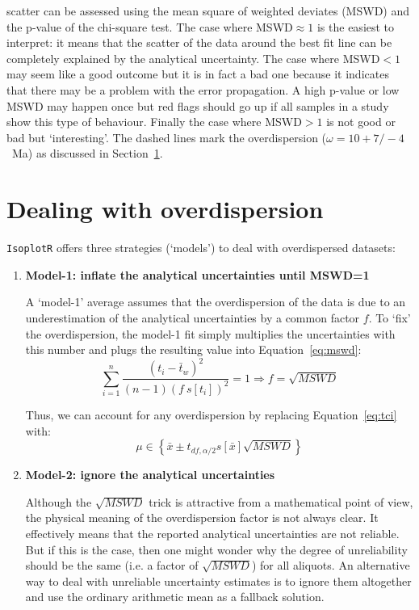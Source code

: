 \begin{refsection}
\begin{minipage}[t]{.58\textwidth}
{    scatter can be assessed using the mean square of weighted deviates
    (MSWD) and the p-value of the chi-square test. The case where
    MSWD$\approx{1}$ is the easiest to interpret: it means that the
    scatter of the data around the best fit line can be completely
    explained by the analytical uncertainty. The case where MSWD$<{1}$
    may seem like a good outcome but it is in fact a bad one because
    it indicates that there may be a problem with the error
    propagation. A high p-value or low MSWD may happen once but red
    flags should go up if all samples in a study show this type of
    behaviour. Finally the case where MSWD$>{1}$ is not good or bad
    but `interesting'. The dashed lines mark the overdispersion
    ($\omega=10 +7/-4$~Ma) as discussed in
    Section~\ref{sec:overdispersion}.}
  \label{fig:wtdmeanMSWD}
\end{minipage}

\section{Dealing with overdispersion}
\label{sec:overdispersion}

\texttt{IsoplotR} offers three strategies (`models') to deal with
overdispersed datasets:

\begin{enumerate}
\item\textbf{Model-1: inflate the analytical uncertainties until MSWD=1}

  A `model-1' average assumes that the overdispersion of the data is due
  to an underestimation of the analytical uncertainties by a common
  factor $f$. To `fix' the overdispersion, the model-1 fit simply
  multiplies the uncertainties with this number and plugs the resulting
  value into Equation~\ref{eq:mswd}:
  \[
  \sum\limits_{i=1}^{n}\frac{(t_i-\bar{t}_w)^2}{(n-1) (f~s[t_i])^2} = 1
  \Rightarrow f = \sqrt{MSWD}
  \]

  Thus, we can account for any overdispersion by replacing
  Equation~\ref{eq:tci} with:
  \begin{equation}
    \mu \in \left\{\bar{x} \pm t_{df,\alpha/2} s[\bar{x}] \sqrt{MSWD} \right\}
    \label{eq:tci}
  \end{equation}

\item\textbf{Model-2: ignore the analytical uncertainties}
  
  Although the $\sqrt{MSWD}$ trick is attractive from a mathematical
  point of view, the physical meaning of the overdispersion factor is
  not always clear. It effectively means that the reported analytical
  uncertainties are not reliable. But if this is the case, then one
  might wonder why the degree of unreliability should be the same
  (i.e. a factor of $\sqrt{MSWD}$) for all aliquots. An alternative
  way to deal with unreliable uncertainty estimates is to ignore them
  altogether and use the ordinary arithmetic mean as a fallback
  solution.
  

\end{enumerate}
\end{refsection}
